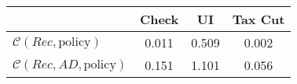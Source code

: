 \begin{tabular}{@{}lccc@{}} 
\toprule 
                          & Check      & UI    & Tax Cut    \\  \midrule 
$\mathcal{C}(Rec,\text{policy})$ & 0.011  & 0.509  & 0.002     \\ 
$\mathcal{C}(Rec, AD,\text{policy})$ & 0.151  & 1.101  & 0.056     \\ 
\end{tabular}  
